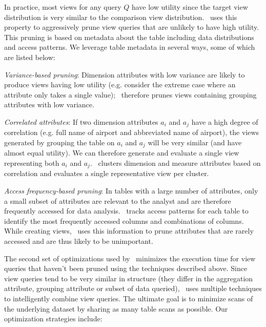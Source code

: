 In practice, most views for any query $Q$ have low utility since the target view
distribution is very similar to the comparison view distribution. 
\SeeDB\ uses this property to aggressively prune 
view queries that are unlikely to have high utility. 
This pruning is based on metadata about the table including data
distributions and access patterns.
We leverage table metadata in several ways, some of which are listed below:
\begin{denselist}
\item {\it Variance-based pruning}: Dimension attributes with low variance are
likely to produce views having low utility (e.g. consider the extreme case where
an attribute only takes a single value); \SeeDB\ therefore prunes views
containing grouping attributes with low variance.
\item {\it Correlated attributes}: If two dimension attributes $a_i$ and $a_j$ have
a high degree of correlation (e.g. full name of airport and abbreviated name of
airport), the views generated by grouping the table on $a_i$ and $a_j$ will be
very similar (and have almost equal utility). We can therefore generate and
evaluate a single view representing both $a_i$ and $a_j$. \SeeDB\ clusters
dimension and measure attributes based on correlation and evaluates a single representative view per
cluster.
\item {\it Access frequency-based pruning}: In tables with a large number of
attributes, only a small subset of attributes are relevant to the analyst and
are therefore frequently accessed for data analysis. \SeeDB\ tracks access patterns
for each table to identify the most frequently accessed columns and combinations of
columns. While creating views, \SeeDB\ uses this information to prune attributes
that are rarely accessed and are thus likely to be unimportant.
\end{denselist}

The second set of optimizations used by \SeeDB\ minimizes the execution time for
view queries that haven't been pruned using the techniques described above.
Since view queries tend to be very similar in structure (they differ in the aggregation
attribute, grouping attribute or subset of data queried), \SeeDB\ uses multiple
techniques to intelligently combine view queries.
The ultimate goal is to minimize scans of the underlying dataset by sharing as
many table scans as possible. Our optimization strategies include:

